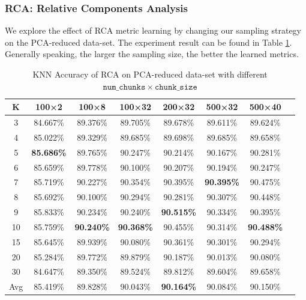 \subsubsection{RCA: Relative Components Analysis}

We explore the effect of RCA metric learning by changing our sampling strategy on the PCA-reduced data-set. The experiment result can be found in Table \ref{tab:rca}. Generally speaking, the larger the sampling size, the better the learned metrics. 

\begin{table}[h]
\centering
\caption{KNN Accuracy of RCA on PCA-reduced data-set with different $\mathtt{num\_chunks}\times\mathtt{chunk\_size}$\label{tab:rca}}
\begin{tabular}{cccccccc}
\hline
K   & 100×2             & 100×8             & 100×32            & 200×32            & 500×32            & 500×40            \\ \hline
3   & 84.667\%          & 89.376\%          & 89.705\%          & 89.678\%          & 89.611\%          & 89.624\%          \\
4   & 85.022\%          & 89.329\%          & 89.685\%          & 89.698\%          & 89.685\%          & 89.658\%          \\
5   & \textbf{85.686\%} & 89.765\%          & 90.247\%          & 90.214\%          & 90.167\%          & 90.281\%          \\
6   & 85.659\%          & 89.778\%          & 90.100\%          & 90.207\%          & 90.194\%          & 90.247\%          \\
7   & 85.719\%          & 90.227\%          & 90.354\%          & 90.395\%          & \textbf{90.395\%} & 90.475\%          \\
8   & 85.692\%          & 90.100\%          & 90.294\%          & 90.281\%          & 90.307\%          & 90.448\%          \\
9   & 85.833\%          & 90.234\%          & 90.240\%          & \textbf{90.515\%} & 90.334\%          & 90.395\%          \\
10  & 85.759\%          & \textbf{90.240\%} & \textbf{90.368\%} & 90.455\%          & 90.314\%          & \textbf{90.488\%} \\
15  & 85.645\%          & 89.939\%          & 90.080\%          & 90.361\%          & 90.301\%          & 90.294\%          \\
20  & 85.284\%          & 89.772\%          & 89.879\%          & 90.187\%          & 90.013\%          & 90.080\%          \\
30  & 84.647\%          & 89.350\%          & 89.524\%          & 89.812\%          & 89.604\%          & 89.658\%          \\ \hline
Avg & 85.419\%          & 89.828\%          & 90.043\%          & \textbf{90.164\%} & 90.084\%          & 90.150\%          \\ \hline
\end{tabular}
\end{table}
